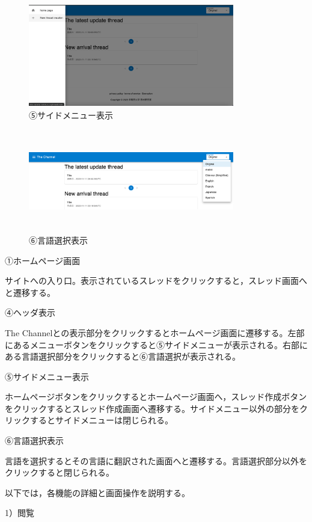 \documentclass[b5paper,12pt]{jsreport}
\begin{document}
\begin{figure}[htbp]
	\centering
	\includegraphics[width=90mm,height=45mm]{img/side_menu.png}

	\caption*{⑤サイドメニュー表示}
\end{figure}

\begin{figure}[htbp]
	\centering
	\includegraphics[width=90mm,height=45mm]{./img/select_language.png}

	\caption*{⑥言語選択表示}
\end{figure}

①ホームページ画面

サイトへの入り口。表示されているスレッドをクリックすると，スレッド画面へと遷移する。

④ヘッダ表示

The Channelとの表示部分をクリックするとホームページ画面に遷移する。左部にあるメニューボタンをクリックすると⑤サイドメニューが表示される。右部にある言語選択部分をクリックすると⑥言語選択が表示される。

⑤サイドメニュー表示

ホームページボタンをクリックするとホームページ画面へ，スレッド作成ボタンをクリックするとスレッド作成画面へ遷移する。サイドメニュー以外の部分をクリックするとサイドメニューは閉じられる。

⑥言語選択表示

言語を選択するとその言語に翻訳された画面へと遷移する。言語選択部分以外をクリックすると閉じられる。


以下では，各機能の詳細と画面操作を説明する。

1）閲覧
\end{document}

